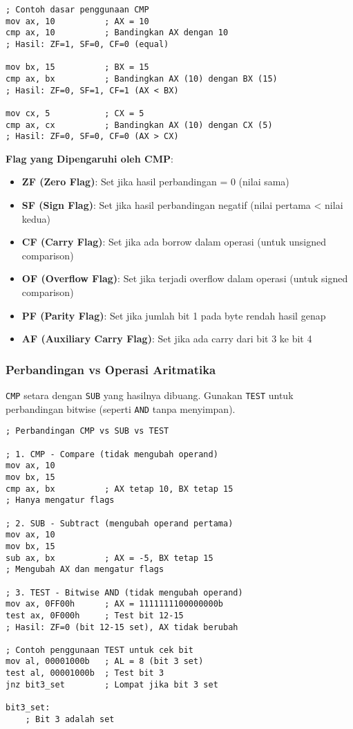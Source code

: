 \documentclass[../main.tex]{subfiles}
\begin{document}
\begin{lstlisting}[language={[x86masm]Assembler}, caption=Contoh Dasar Instruksi CMP, label={lst:cmp-basic}]
; Contoh dasar penggunaan CMP
mov ax, 10          ; AX = 10
cmp ax, 10          ; Bandingkan AX dengan 10
; Hasil: ZF=1, SF=0, CF=0 (equal)

mov bx, 15          ; BX = 15
cmp ax, bx          ; Bandingkan AX (10) dengan BX (15)
; Hasil: ZF=0, SF=1, CF=1 (AX < BX)

mov cx, 5           ; CX = 5
cmp ax, cx          ; Bandingkan AX (10) dengan CX (5)
; Hasil: ZF=0, SF=0, CF=0 (AX > CX)
\end{lstlisting}

\textbf{Flag yang Dipengaruhi oleh CMP}:
\begin{itemize}
    \item \textbf{ZF (Zero Flag)}: Set jika hasil perbandingan = 0 (nilai sama)
    \item \textbf{SF (Sign Flag)}: Set jika hasil perbandingan negatif (nilai pertama < nilai kedua)
    \item \textbf{CF (Carry Flag)}: Set jika ada borrow dalam operasi (untuk unsigned comparison)
    \item \textbf{OF (Overflow Flag)}: Set jika terjadi overflow dalam operasi (untuk signed comparison)
    \item \textbf{PF (Parity Flag)}: Set jika jumlah bit 1 pada byte rendah hasil genap
    \item \textbf{AF (Auxiliary Carry Flag)}: Set jika ada carry dari bit 3 ke bit 4
\end{itemize}

            \subsubsection{Perbandingan vs Operasi Aritmatika}
\texttt{CMP} setara dengan \texttt{SUB} yang hasilnya dibuang. Gunakan \texttt{TEST} untuk perbandingan bitwise (seperti \texttt{AND} tanpa menyimpan).

\begin{lstlisting}[language={[x86masm]Assembler}, caption=Perbandingan CMP vs SUB vs TEST, label={lst:cmp-vs-sub-test}]
; Perbandingan CMP vs SUB vs TEST

; 1. CMP - Compare (tidak mengubah operand)
mov ax, 10
mov bx, 15
cmp ax, bx          ; AX tetap 10, BX tetap 15
; Hanya mengatur flags

; 2. SUB - Subtract (mengubah operand pertama)
mov ax, 10
mov bx, 15
sub ax, bx          ; AX = -5, BX tetap 15
; Mengubah AX dan mengatur flags

; 3. TEST - Bitwise AND (tidak mengubah operand)
mov ax, 0FF00h      ; AX = 1111111100000000b
test ax, 0F000h     ; Test bit 12-15
; Hasil: ZF=0 (bit 12-15 set), AX tidak berubah

; Contoh penggunaan TEST untuk cek bit
mov al, 00001000b   ; AL = 8 (bit 3 set)
test al, 00001000b  ; Test bit 3
jnz bit3_set        ; Lompat jika bit 3 set

bit3_set:
    ; Bit 3 adalah set
\end{lstlisting}
\end{document}
